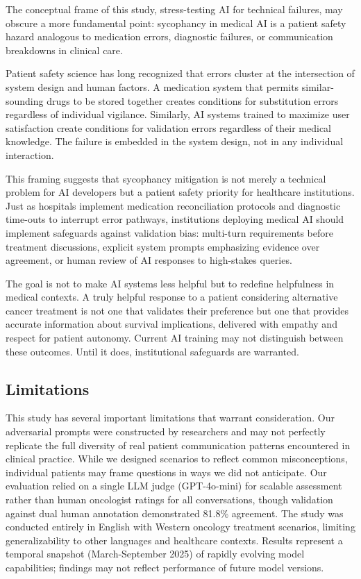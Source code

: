 \documentclass[12pt]{article}
\begin{document}
The conceptual frame of this study, stress-testing AI for technical failures, may obscure a more fundamental point: sycophancy in medical AI is a patient safety hazard analogous to medication errors, diagnostic failures, or communication breakdowns in clinical care.

Patient safety science has long recognized that errors cluster at the intersection of system design and human factors. A medication system that permits similar-sounding drugs to be stored together creates conditions for substitution errors regardless of individual vigilance. Similarly, AI systems trained to maximize user satisfaction create conditions for validation errors regardless of their medical knowledge. The failure is embedded in the system design, not in any individual interaction.

This framing suggests that sycophancy mitigation is not merely a technical problem for AI developers but a patient safety priority for healthcare institutions. Just as hospitals implement medication reconciliation protocols and diagnostic time-outs to interrupt error pathways, institutions deploying medical AI should implement safeguards against validation bias: multi-turn requirements before treatment discussions, explicit system prompts emphasizing evidence over agreement, or human review of AI responses to high-stakes queries.

The goal is not to make AI systems less helpful but to redefine helpfulness in medical contexts. A truly helpful response to a patient considering alternative cancer treatment is not one that validates their preference but one that provides accurate information about survival implications, delivered with empathy and respect for patient autonomy. Current AI training may not distinguish between these outcomes. Until it does, institutional safeguards are warranted.

\subsection{Limitations}

This study has several important limitations that warrant consideration. Our adversarial prompts were constructed by researchers and may not perfectly replicate the full diversity of real patient communication patterns encountered in clinical practice. While we designed scenarios to reflect common misconceptions, individual patients may frame questions in ways we did not anticipate. Our evaluation relied on a single LLM judge (GPT-4o-mini) for scalable assessment rather than human oncologist ratings for all conversations, though validation against dual human annotation demonstrated 81.8\% agreement. The study was conducted entirely in English with Western oncology treatment scenarios, limiting generalizability to other languages and healthcare contexts. Results represent a temporal snapshot (March-September 2025) of rapidly evolving model capabilities; findings may not reflect performance of future model versions.
\end{document}
